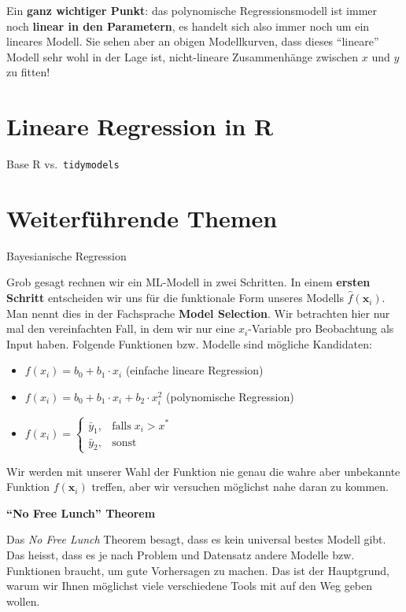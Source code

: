 \documentclass[
]{book}
\providecommand{\tightlist}{%
  \setlength{\itemsep}{0pt}\setlength{\parskip}{0pt}}
\begin{document}
Ein \textbf{ganz wichtiger Punkt}: das polynomische Regressionsmodell ist immer noch \textbf{linear in den Parametern}, es handelt sich also immer noch um ein lineares Modell. Sie sehen aber an obigen Modellkurven, dass dieses ``lineare'' Modell sehr wohl in der Lage ist, nicht-lineare Zusammenhänge zwischen \(x\) und \(y\) zu fitten!

\hypertarget{lineare-regression-in-r}{%
\section{Lineare Regression in R}\label{lineare-regression-in-r}}

Base R vs.~\texttt{tidymodels}

\hypertarget{weiterfuxfchrende-themen}{%
\section{Weiterführende Themen}\label{weiterfuxfchrende-themen}}

Bayesianische Regression

Grob gesagt rechnen wir ein ML-Modell in zwei Schritten. In einem \textbf{ersten Schritt} entscheiden wir uns für die funktionale Form unseres Modells \(\hat{f}(\mathbf{x}_i)\). Man nennt dies in der Fachsprache \textbf{Model Selection}. Wir betrachten hier nur mal den vereinfachten Fall, in dem wir nur eine \(x_i\)-Variable pro Beobachtung als Input haben. Folgende Funktionen bzw. Modelle sind mögliche Kandidaten:

\begin{itemize}
\tightlist
\item
  \(f(x_i) = b_0 + b_1 \cdot x_i\) (einfache lineare Regression)
\item
  \(f(x_i) = b_0 + b_1 \cdot x_i + b_2 \cdot x_i^2\) (polynomische Regression)
\item
  \(f(x_i) = \begin{cases} \bar{y}_1, & \text{falls}\; x_i > x^*\\ \bar{y}_2, & \text{sonst} \end{cases}\)
\end{itemize}

Wir werden mit unserer Wahl der Funktion nie genau die wahre aber unbekannte Funktion \(f(\mathbf{x}_i)\) treffen, aber wir versuchen möglichst nahe daran zu kommen.

\textbf{``No Free Lunch'' Theorem}

Das \emph{No Free Lunch} Theorem besagt, dass es kein universal bestes Modell gibt. Das heisst, dass es je nach Problem und Datensatz andere Modelle bzw. Funktionen braucht, um gute Vorhersagen zu machen. Das ist der Hauptgrund, warum wir Ihnen möglichst viele verschiedene Tools mit auf den Weg geben wollen.
\end{document}
